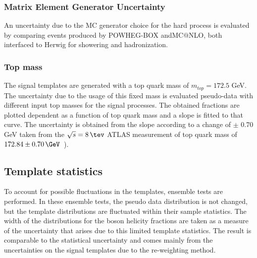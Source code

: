 \subsubsection{Matrix Element Generator Uncertainty}
An uncertainty due to the MC generator choice for the hard process is evaluated by comparing events produced by
{\sc POWHEG-BOX} and{\sc MC$@$NLO}, both interfaced to {\sc Herwig} for showering and hadronization.

\subsubsection{Top mass}
The signal templates are generated with a top quark mass of $m_{top}=172.5$ GeV. The uncertainty due to the usage of this fixed mass is evaluated pseudo-data with different input top masses for the signal processes. The obtained fractions are plotted dependent as a function of top quark mass and a slope is fitted to that curve. The uncertainty is obtained from the slope according to a change of $\pm$ 0.70 GeV taken from the $\sqrt{s}=8\,\tev$ ATLAS measurement of top quark mass of $172.84 \pm 0.70\,\GeV$~\cite{TOPQ-2013-06}). %

\subsection{Template statistics}
To account for possible fluctuations in the templates, ensemble tests are performed. In these ensemble tests, the pseudo data distribution is not changed, but the template distributions are fluctuated within their sample statistics. The width of the distributions for the \w boson helicity fractions are taken as a measure of the uncertainty that arises due to this limited template statistics. The result is comparable to the statistical uncertainty and comes mainly from the uncertainties on the signal templates due to the re-weighting method. %

